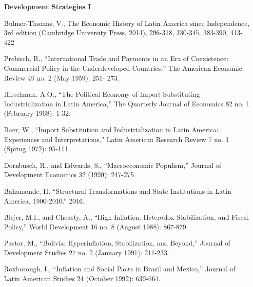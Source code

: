 \documentclass[letterpaper]{article}
\renewenvironment{itemize}{
  \begin{list}{}{
    \setlength{\leftmargin}{1.5em}
  }
}{
  \end{list}
}
\begin{document}
\begin{enumerate}
\item {\bf Development Strategies I}
	\begin{itemize}
		\item[$\bullet$] Bulmer-Thomas, V., The Economic History of Latin America since Independence, 3rd edition (Cambridge University Press, 2014), 296-318, 330-345, 383-390, 413-422
		\item[$\bullet$] Prebisch, R., ``International Trade and Payments in an Era of Coexistence: Commercial Policy in the Underdeveloped Countries,'' The American Economic Review 49 no. 2 (May 1959): 251- 273.
		\item[$\bullet$] Hirschman, A.O., ``The Political Economy of Import-Substituting Industrialization in Latin America,'' The Quarterly Journal of Economics 82 no. 1 (February 1968): 1-32.
		\item[$\bullet$] Baer, W., ``Import Substitution and Industrialization in Latin America: Experiences and Interpretations,'' Latin American Research Review 7 no. 1 (Spring 1972): 95-111.
		\item[$\bullet$] Dornbusch, R., and Edwards, S., ``Macroeconomic Populism,'' Journal of Development Economics 32 (1990): 247-275.
		\item[$\bullet$] Bahamonde, H. ``Structural Transformations and State Institutions in Latin America, 1900-2010.'' 2016.
		\item[$\bullet$] Blejer, M.I., and Cheasty, A., ``High Inflation, Heterodox Stabilization, and Fiscal Policy,'' World Development 16 no. 8 (August 1988): 867-879.
		\item[$\bullet$] Pastor, M., ``Bolivia: Hyperinflation, Stabilization, and Beyond,'' Journal of Development Studies 27 no. 2 (January 1991): 211-233.
		\item[$\bullet$] Roxborough, I., ``Inflation and Social Pacts in Brazil and Mexico,'' Journal of Latin American Studies 24 (October 1992): 639-664.
	\end{itemize}




\end{enumerate}
\end{document}

